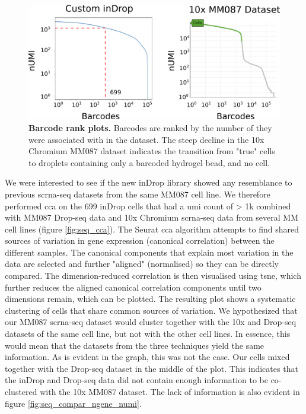 \begin{figure}[ht]
\centerfloat
\includegraphics[width=\textwidth]{./ims/seq_kneeplot.png}
\caption[Barcode rank plots]{\textbf{Barcode rank plots.} Barcodes are ranked by the number of  they were associated with in the dataset. The steep decline in the 10x Chromium MM087 dataset indicates the transition from "true" cells to droplets containing only a barcoded hydrogel bead, and no cell.}
\label{fig:seq_ind_kneeplot}
\end{figure}

We were interested to see if the new inDrop library showed any resemblance to previous \acrshort{scrna-seq} datasets from the same MM087 cell line. We therefore performed \acrfull{cca} on the 699 inDrop cells that had a \acrshort{umi} count of > 1k combined with MM087 Drop-seq data and 10x Chromium \acrshort{scrna-seq} data from several MM cell lines (figure \ref{fig:seq_cca}). The Seurat \acrshort{cca} algorithm attempts to find shared sources of variation in gene expression (canonical correlation) between the different samples. The canonical components that explain most variation in the data are selected and further "aligned" (normalised) so they can be directly compared. The dimension-reduced correlation is then visualised using \acrfull{tsne}, which further reduces the aligned canonical correlation components until two dimensions remain, which can be plotted. The resulting plot shows a systematic clustering of cells that share common sources of variation. We hypothesized that our MM087 \acrshort{scrna-seq} dataset would cluster together with the 10x and Drop-seq datasets of the same cell line, but not with the other cell lines. In essence, this would mean that the datasets from the three techniques yield the same information. As is evident in the graph, this was not the case. Our cells mixed together with the Drop-seq dataset in the middle of the plot. This indicates that the inDrop and Drop-seq data did not contain enough information to be co-clustered with the 10x MM087 dataset. The lack of information is also evident in figure \ref{fig:seq_compar_ngene_numi}.\pms

